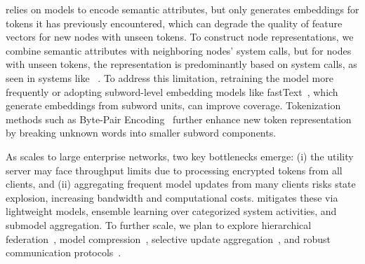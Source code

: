  \Sys relies on \wordvec models to encode semantic attributes, but \wordvec only generates embeddings for tokens it has previously encountered, which can degrade the quality of feature vectors for new nodes with unseen tokens. To construct node representations, we combine semantic attributes with neighboring nodes' system calls, but for nodes with unseen tokens, the representation is predominantly based on system calls, as seen in systems like \threatrace~\cite{wang2022threatrace}. To address this limitation, retraining the \wordvec model more frequently or adopting subword-level embedding models like fastText~\cite{joulin2016bag}, which generate embeddings from subword units, can improve coverage. Tokenization methods such as Byte-Pair Encoding~\cite{araabi2022effective} further enhance new token representation by breaking unknown words into smaller subword components.

As \Sys scales to large enterprise networks, two key bottlenecks emerge: (i) the utility server may face throughput limits due to processing encrypted tokens from all clients, and (ii) aggregating frequent model updates from many clients risks state explosion, increasing bandwidth and computational costs. \Sys mitigates these via lightweight models, ensemble learning over categorized system activities, and submodel aggregation. To further scale, we plan to explore hierarchical federation~\cite{zhong2022flee}, model compression~\cite{choudhary2020comprehensive}, selective update aggregation~\cite{ye2020federated}, and robust communication protocols~\cite{laclau2020robust}.






